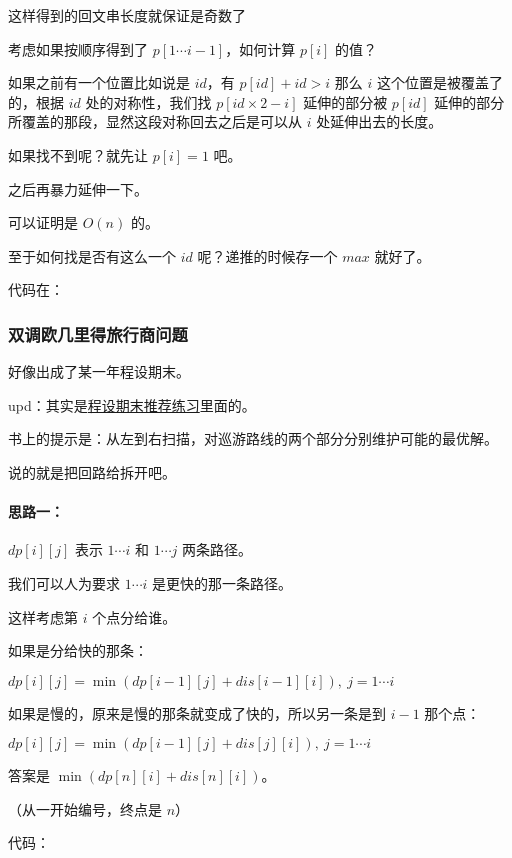 这样得到的回文串长度就保证是奇数了

考虑如果按顺序得到了 $p[1 \cdots i - 1]$，如何计算 $p[i]$ 的值？

如果之前有一个位置比如说是 $id$，有 $p[id] + id > i$ 那么 $i$ 这个位置是被覆盖了的，根据 $id$ 处的对称性，我们找 $p[id \times 2 - i]$ 延伸的部分被 $p[id]$ 延伸的部分所覆盖的那段，显然这段对称回去之后是可以从 $i$ 处延伸出去的长度。

如果找不到呢？就先让 $p[i] = 1$ 吧。

之后再暴力延伸一下。

可以证明是 $O(n)$ 的。

至于如何找是否有这么一个 $id$ 呢？递推的时候存一个 $max$ 就好了。

代码在：\href{https://github.com/Ir1d/Fantasy/blob/master/HDU/3068.cpp}{}

\subsubsection{双调欧几里得旅行商问题}

好像出成了某一年程设期末。

upd：其实是\href{https://ir1d.cf/2018/06/23/cssx/程设期末推荐练习/}{程设期末推荐练习}里面的。

书上的提示是：从左到右扫描，对巡游路线的两个部分分别维护可能的最优解。

说的就是把回路给拆开吧。

\paragraph{思路一：}

$dp[i][j]$ 表示 $1 \cdots i$ 和 $1 \cdots j$ 两条路径。

我们可以人为要求 $1 \cdots i$ 是更快的那一条路径。

这样考虑第 $i$ 个点分给谁。

如果是分给快的那条：

$dp[i][j] = \min(dp[i - 1][j] + dis[i - 1][i]),\ j = 1 \cdots i$

如果是慢的，原来是慢的那条就变成了快的，所以另一条是到 $i - 1$ 那个点：

$dp[i][j] = \min(dp[i - 1][j] + dis[j][i]),\ j = 1 \cdots i$

答案是 $\min(dp[n][i] + dis[n][i])$。

（从一开始编号，终点是 $n$）

代码：\href{https://github.com/Ir1d/Fantasy/blob/master/openjudge/cssx/2018rec/11.cpp}{}

